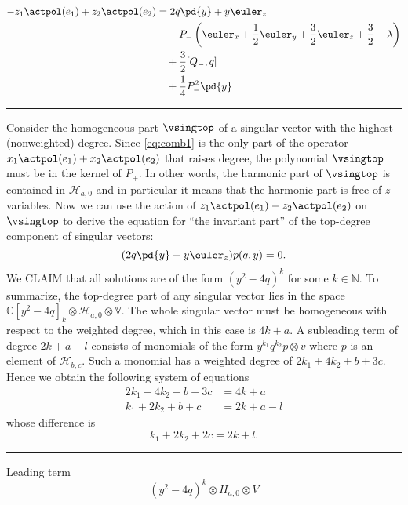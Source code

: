 \begin{align}
-z_1 \actpol(e_1) + z_2 \actpol(e_2) &= 2q\pd{y} + y \euler_z \\
        & \quad -P_-\left( \euler_x + \frac{1}{2}\euler_y  + \frac{3}{2}\euler_z + \frac{3}{2} - \lambda \right)\\
        & \quad +\frac{3}{2}[Q_-, q] \\
        & \quad +\frac{1}{4}P_-^2 \pd{y}
\end{align}

\bigskip
\hrule
\bigskip

Consider the homogeneous part $\vsingtop$ of a singular vector with the highest (nonweighted) degree. Since \eqref{eq:comb1} is the only part of the operator $x_1\actpol(e_1) + x_2\actpol(e_2)$ that raises degree, the polynomial $\vsingtop$ must be in the kernel of $P_+$. In other words, the harmonic part of $\vsingtop$ is contained in $\mathcal{H}_{a,0}$ and in particular it means that the harmonic part is free of $z$ variables. Now we can use the action of $z_1\actpol(e_1) - z_2\actpol(e_2)$ on $\vsingtop$ to derive the equation for ``the invariant part'' of the top-degree component of singular vectors:
\[
(2q\pd{y} + y\euler_z) p(q,y) = 0.
\]%
We CLAIM that all solutions are of the form $(y^2 - 4q)^k$ for some $k\in\mathbb{N}$. To summarize, the top-degree part of any singular vector lies in the space $\mathbb{C}[y^2 - 4q]_k \otimes \mathcal{H}_{a,0} \otimes \mathbb{V}$. The whole singular vector must be homogeneous with respect to the weighted degree, which in this case is $4k + a$. A subleading term of degree $2k + a - l$ consists of monomials of the form $y^{k_1}q^{k_2} p \otimes v$ where $p$ is an element of $\mathcal{H}_{b,c}$. Such a monomial has a weighted degree of $2k_1 + 4k_2 + b + 3c$. Hence we obtain the following system of equations
\begin{align}
 2k_1 + 4k_2 + b + 3c & = 4k + a \\
  k_1 + 2k_2 + b +  c & = 2k + a - l
\end{align}
whose difference is
\[
k_1 + 2k_2 + 2c = 2k + l.
\]

\bigskip
\hrule
\pagebreak
\bigskip

Leading term
\[
    (y^2-4q)^k \otimes H_{a,0} \otimes V
\]

